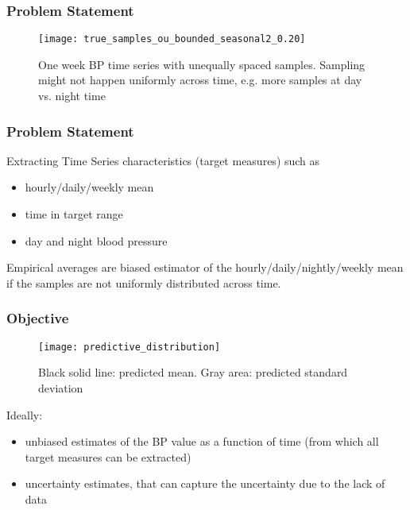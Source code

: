\documentclass[
	8pt, %
]{beamer}
\begin{document}


\begin{frame}
	\frametitle{Problem Statement}

		\begin{figure}
				\texttt{[image: true\_samples\_ou\_bounded\_seasonal2\_0.20]}
				\caption{One week BP time series with unequally spaced samples. Sampling might not happen
				uniformly across time, e.g. more samples at day vs. night time}
		\end{figure}

\end{frame}


\begin{frame}
	\frametitle{Problem Statement}

		Extracting Time Series characteristics (target measures) such as
		\begin{itemize}
		\item hourly/daily/weekly mean
		\item time in target range
		\item day and night blood pressure
		\end{itemize}

	\bigskip %

	Empirical averages are biased estimator of the hourly/daily/nightly/weekly mean if
	the samples are not uniformly distributed across time.

\end{frame}


\begin{frame}
	\frametitle{Objective}

		\begin{figure}
				\texttt{[image: predictive\_distribution]}
				\caption{Black solid line: predicted mean. Gray area: predicted standard deviation}
		\end{figure}

	Ideally:
	\begin{itemize}
		\item unbiased estimates of the BP value as a function of time (from which all target
		measures can be extracted)
		\item uncertainty estimates, that can capture the uncertainty due to the lack of data
	\end{itemize}
\end{frame}
\end{document}

